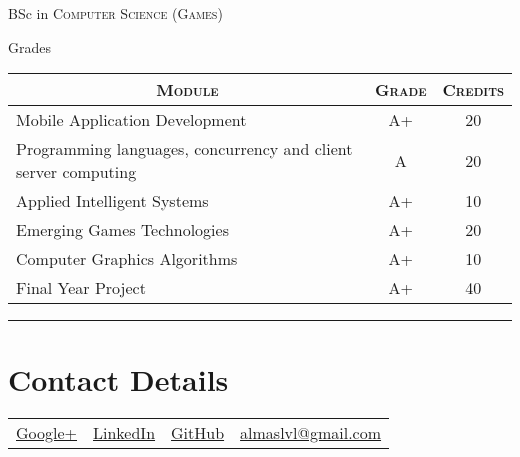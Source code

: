 \documentclass[a4paper,10pt]{article} %
\begin{document}

\par{\centering\Large \hypertarget{grds}{BSc in \textsc{Computer Science (Games)}}\par}\large{\centering Grades\par}\normalsize

\begin{center}
\begin{tabular}{lcc}
\multicolumn{1}{c}{\textsc{Module}} & \textsc{Grade}&\textsc{Credits}\\ \hline
Mobile Application Development                                  & A+ & 20\\
Programming languages, concurrency and client server computing  & A & 20\\
Applied Intelligent Systems                                     & A+ & 10\\
Emerging Games Technologies                                     & A+ & 20\\
Computer Graphics Algorithms                                    & A+ & 10\\
Final Year Project                                              & A+ & 40\\
\end{tabular}
\end{center}
\bigskip
\hrule
\vspace{1cm}


\section{Contact Details}

\begin{tabular}{c | c | c | c}
\href{https://www.google.com/+AlmasB0}{Google+}
& \href{https://www.linkedin.com/in/AlmasB}{LinkedIn}
& \href{https://github.com/AlmasB}{GitHub}
& \href{mailto:almaslvl@gmail.com}{almaslvl@gmail.com} 


\end{tabular}
\end{document}
